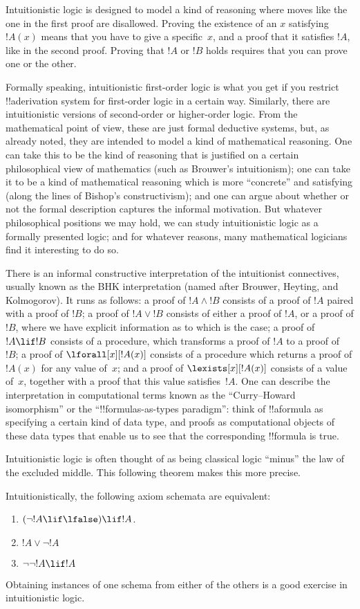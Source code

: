 \documentclass[../../../include/open-logic-section]{subfiles}
\begin{document}
Intuitionistic logic is designed to model a kind of reasoning where
moves like the one in the first proof are disallowed. Proving the
existence of an $x$ satisfying~$!A(x)$ means that you have to give a
specific~$x$, and a proof that it satisfies $!A$, like in the second
proof. Proving that $!A$ or $!B$ holds requires that you can prove one
or the other.

Formally speaking, intuitionistic first-order logic is what you get if
you restrict !!a{derivation} system for first-order logic in a certain
way. Similarly, there are intuitionistic versions of second-order or
higher-order logic. From the mathematical point of view, these are
just formal deductive systems, but, as already noted, they are
intended to model a kind of mathematical reasoning. One can take this
to be the kind of reasoning that is justified on a certain
philosophical view of mathematics (such as Brouwer's intuitionism);
one can take it to be a kind of mathematical reasoning which is more
``concrete'' and satisfying (along the lines of Bishop's
constructivism); and one can argue about whether or not the formal
description captures the informal motivation. But whatever
philosophical positions we may hold, we can study intuitionistic logic
as a formally presented logic; and for whatever reasons, many
mathematical logicians find it interesting to do so.

There is an informal constructive interpretation of the intuitionist
connectives, usually known as the BHK interpretation (named after
Brouwer, Heyting, and Kolmogorov). It runs as follows: a proof of $!A
\land !B$ consists of a proof of $!A$ paired with a proof of $!B$; a
proof of $!A \lor !B$ consists of either a proof of $!A$, or a proof
of $!B$, where we have explicit information as to which is the case; a
proof of $!A \lif !B$ consists of a procedure, which transforms a
proof of $!A$ to a proof of~$!B$; a proof of $\lforall[x][!A(x)]$
consists of a procedure which returns a proof of $!A(x)$ for any value
of~$x$; and a proof of $\lexists[x][!A(x)]$ consists of a value
of~$x$, together with a proof that this value satisfies~$!A$. One can
describe the interpretation in computational terms known as the
``Curry--Howard isomorphism'' or the ``!!{formula}s-as-types
paradigm'': think of !!a{formula} as specifying a certain kind of
data type, and proofs as computational objects of these data types
that enable us to see that the corresponding !!{formula} is true.

Intuitionistic logic is often thought of as being classical logic
``minus'' the law of the excluded middle. This following theorem makes
this more precise.
\begin{thm}
Intuitionistically, the following axiom schemata are equivalent:
\begin{enumerate}
\item $(\lnot !A \lif \lfalse) \lif !A$.
\item $!A \lor \lnot !A$
\item $\lnot \lnot !A \lif !A$
\end{enumerate}
\end{thm}
Obtaining instances of one schema from either of the others is a good
exercise in intuitionistic logic.
\end{document}
